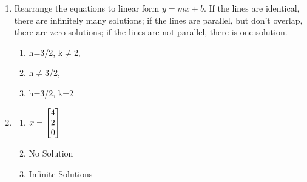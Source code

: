 \begin{sol}
	\begin{enumerate}
		\item Rearrange the equations to linear form $y=mx+b$. If the lines are identical, there are infinitely many solutions; if the lines are parallel, but don't overlap, there are zero solutions; if the lines are not parallel, there is one solution.
		\begin{enumerate}
		    \item h=3/2, k$\neq$2, 
		    \item h$\neq$3/2,
		    \item h=3/2, k=2
		\end{enumerate}
		\item \begin{enumerate}
			\item $x=\begin{bmatrix} 4 \\ 2 \\ 0 \end{bmatrix}$
			\item No Solution
			\item Infinite Solutions
		\end{enumerate}
	\end{enumerate}
\end{sol}

